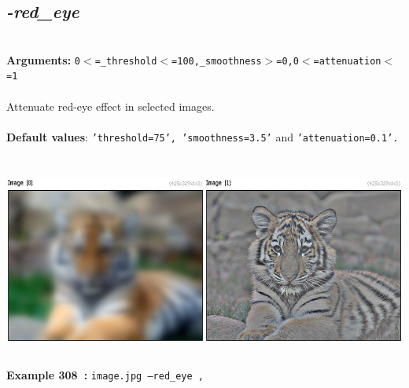 \documentclass[a4paper,11pt,twoside]{book}
\begin{document}
\subsection{\emph{-red\_eye} }\vspace*{-0.5em}
~\\\textbf{Arguments: } 
{\small \texttt{0$<$=\_threshold$<$=100,\_smoothness$>$=0,0$<$=attenuation$<$=1}}\\~\\
Attenuate red-eye effect in selected images.
~\\~\\\textbf{Default values}: {\small \texttt{'threshold=75', 'smoothness=3.5'} and \texttt{'attenuation=0.1'.}}
\begin{center}\includegraphics[keepaspectratio=true,height=7cm,width=\textwidth]{img/gmic_def308.jpg}\\
{\footnotesize \textbf{Example 308~:} \texttt{image.jpg --red\_eye ,}}
\end{center}
\end{document}
